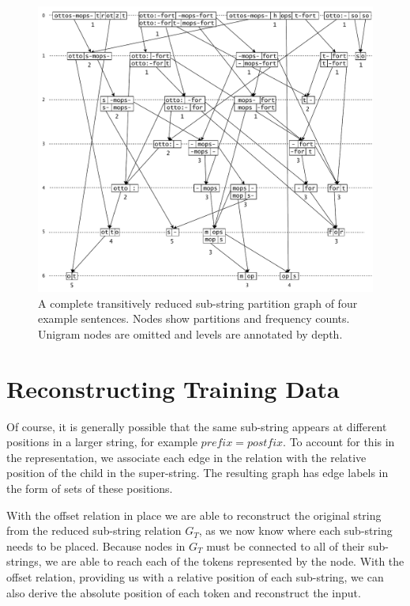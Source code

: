 \newpage
\begin{figure}
\centering
\hspace{-1cm}
\includegraphics[scale=0.68]{images/substring_graph_counted.pdf}
\caption{A complete transitively reduced sub-string partition graph of four example sentences. Nodes show partitions and frequency counts. Unigram nodes are omitted and levels are annotated by depth.}
\end{figure}


\section{Reconstructing Training Data}

Of course, it is generally possible that the same sub-string appears at different positions in a larger string, for example $prefix = postfix$. To account for this in the representation, we associate each edge in the relation with the relative position of the child in the super-string. The resulting graph has edge labels in the form of sets of these positions.

With the offset relation in place we are able to reconstruct the original string from the reduced sub-string relation $G_T$, as we now know where each sub-string needs to be placed. Because nodes in $G_T$ must be connected to all of their sub-strings, we are able to reach each of the tokens represented by the node. With the offset relation, providing us with a relative position of each sub-string, we can also derive the absolute position of each token and reconstruct the input.


